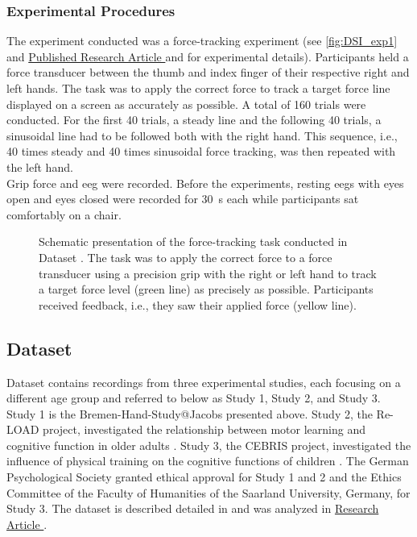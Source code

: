 \subsubsection{Experimental Procedures}
\label{methods:datasets:I:experiment}
The experiment conducted was a force-tracking experiment (see \autoref{fig:DSI_exp1} and \hyperref[pub:paperI]{Published Research Article } and \hyperref[pub:paperI]{} for experimental details). Participants held a force transducer between the thumb and index finger of their respective right and left hands. The task was to apply the correct force to track a target force line displayed on a screen as accurately as possible. A total of 160 trials were conducted. For the first 40 trials, a steady line and the following 40 trials, a sinusoidal line had to be followed both with the right hand. This sequence, i.e., 40 times steady and 40 times sinusoidal force tracking, was then repeated with the left hand.\\
Grip force and \gls{eeg} were recorded. Before the experiments, resting \glspl{eeg} with eyes open and eyes closed were recorded for 30~s each while participants sat comfortably on a chair.

\begin{figure}[ht]
\begin{center}

\captionsetup{justification=justified}
\caption[Schematic presentation of the force-tracking task conducted in Dataset .]{Schematic presentation of the force-tracking task conducted in Dataset . The task was to apply the correct force to a force transducer using a precision grip with the right or left hand to track a target force level (green line) as precisely as possible. Participants received feedback, i.e., they saw their applied force (yellow line).}
\label{fig:DSI_exp1}
\end{center}
\end{figure}

\newpage
\subsection{Dataset }
\label{methods:datasets:II}
Dataset  contains recordings from three experimental studies, each focusing on a different age group and referred to below as Study 1, Study 2, and Study 3.\\
Study 1 is the Bremen-Hand-Study@Jacobs presented above. Study 2, the Re-LOAD project, investigated the relationship between motor learning and cognitive function in older adults \cite{Hübner2018a, Hübner2018b}. Study 3, the CEBRIS project, investigated the influence of physical training on the cognitive functions of children \cite{Koutsandreou2016}. The German Psychological Society granted ethical approval for Study 1 and 2 and the Ethics Committee of the Faculty of Humanities of the Saarland University, Germany, for Study 3. The dataset is described detailed in \cite{Reuter2019} and was analyzed in \hyperref[results:paperII]{Research Article }.

